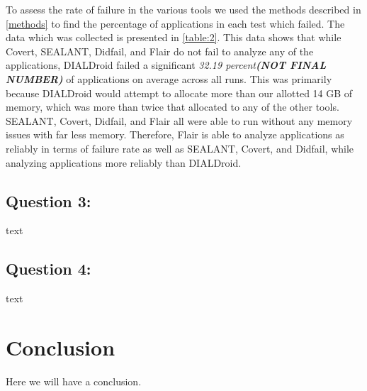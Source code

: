 \documentclass[twocolumn]{article}
\begin{document}
		To assess the rate of failure in the various tools we used the methods described in \ref{methods} to find the percentage of applications in each test which failed. The data which was collected is presented in \ref{table:2}. This data shows that while Covert, SEALANT, Didfail, and Flair do not fail to analyze any of the applications, DIALDroid failed a significant \textit{32.19 percent\textbf{(NOT FINAL NUMBER)}} of applications on average across all runs. This was primarily because DIALDroid would attempt to allocate more than our allotted 14 GB of memory, which was more than twice that allocated to any of the other tools. SEALANT, Covert, Didfail, and Flair all were able to run without any memory issues with far less memory. Therefore, Flair is able to analyze applications as reliably in terms of failure rate as well as SEALANT, Covert, and Didfail, while analyzing applications more reliably than DIALDroid.
		
	\subsection{Question 3:}
		text
	\subsection{Question 4:}
		text


\section[3]{Conclusion}
Here we will have a conclusion.
\end{document}
